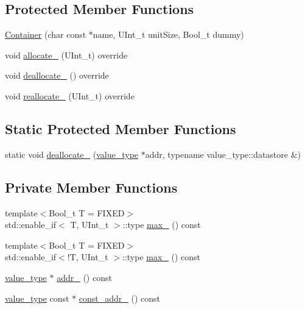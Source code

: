 \subsection*{Protected Member Functions}
\begin{DoxyCompactItemize}
\item 
\hyperlink{classpanda_1_1Container_a1a71d82aec393572c66f1c5626f53f96}{Container} (char const $\ast$name, U\-Int\-\_\-t unit\-Size, Bool\-\_\-t dummy)
\item 
void \hyperlink{classpanda_1_1Container_ae5a51ee9f641dc82a8c130f5949af194}{allocate\-\_\-} (U\-Int\-\_\-t) override
\item 
void \hyperlink{classpanda_1_1Container_a596bcb876563fc9f25ddfe730c1e60da}{deallocate\-\_\-} () override
\item 
void \hyperlink{classpanda_1_1Container_ac46ef511210265180579d57a9378b7de}{reallocate\-\_\-} (U\-Int\-\_\-t) override
\end{DoxyCompactItemize}
\subsection*{Static Protected Member Functions}
\begin{DoxyCompactItemize}
\item 
static void \hyperlink{classpanda_1_1Container_a3c8a966b4dde761603ecfc9232edeefe}{deallocate\-\_\-} (\hyperlink{classpanda_1_1Container_ad0e3660560ba84378cccf0f00a03d56f}{value\-\_\-type} $\ast$addr, typename value\-\_\-type\-::datastore \&)
\end{DoxyCompactItemize}
\subsection*{Private Member Functions}
\begin{DoxyCompactItemize}
\item 
{\footnotesize template$<$Bool\-\_\-t T = F\-I\-X\-E\-D$>$ }\\std\-::enable\-\_\-if$<$ T, U\-Int\-\_\-t $>$\-::type \hyperlink{classpanda_1_1Container_a0873333a978d458a525f855d73416e09}{max\-\_\-} () const 
\item 
{\footnotesize template$<$Bool\-\_\-t T = F\-I\-X\-E\-D$>$ }\\std\-::enable\-\_\-if$<$!T, U\-Int\-\_\-t $>$\-::type \hyperlink{classpanda_1_1Container_a59db87b73977e9e639a36072d73ffc9a}{max\-\_\-} () const 
\item 
\hyperlink{classpanda_1_1Container_ad0e3660560ba84378cccf0f00a03d56f}{value\-\_\-type} $\ast$ \hyperlink{classpanda_1_1Container_a3e3139381afff7a2bea1e46685a4c734}{addr\-\_\-} () const 
\item 
\hyperlink{classpanda_1_1Container_ad0e3660560ba84378cccf0f00a03d56f}{value\-\_\-type} const $\ast$ \hyperlink{classpanda_1_1Container_a92b22e7d3f1f73de8e9a8b4350bc8f2f}{const\-\_\-addr\-\_\-} () const 
\end{DoxyCompactItemize}


